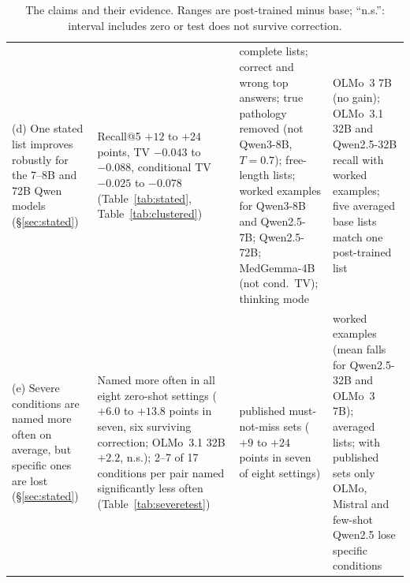 \documentclass[11pt]{article}
\begin{document}
\begin{table}[p]
\begin{tabular}{L{2.8cm}L{4.6cm}L{3.4cm}L{3.6cm}}
(d) One stated list improves robustly for the 7--8B and 72B Qwen models (\S\ref{sec:stated}) & Recall@5 $+12$ to $+24$ points, TV $-0.043$ to $-0.088$, conditional TV $-0.025$ to $-0.078$ (Table~\ref{tab:stated}, Table~\ref{tab:clustered}) & complete lists; correct and wrong top answers; true pathology removed (not Qwen3-8B, $T{=}0.7$); free-length lists; worked examples for Qwen3-8B and Qwen2.5-7B; Qwen2.5-72B; MedGemma-4B (not cond.\ TV); thinking mode & OLMo~3 7B (no gain); OLMo~3.1 32B and Qwen2.5-32B recall with worked examples; five averaged base lists match one post-trained list \\
(e) Severe conditions are named more often on average, but specific ones are lost (\S\ref{sec:stated}) & Named more often in all eight zero-shot settings ($+6.0$ to $+13.8$ points in seven, six surviving correction; OLMo~3.1 32B $+2.2$, n.s.); 2--7 of 17 conditions per pair named significantly less often (Table~\ref{tab:severetest}) & published must-not-miss sets ($+9$ to $+24$ points in seven of eight settings) & worked examples (mean falls for Qwen2.5-32B and OLMo~3 7B); averaged lists; with published sets only OLMo, Mistral and few-shot Qwen2.5 lose specific conditions \\
\bottomrule
\end{tabular}
\caption{The claims and their evidence. Ranges are post-trained minus base; ``n.s.'': interval includes zero or test does not survive correction.}
\label{tab:claims}
\end{table}
\end{document}
